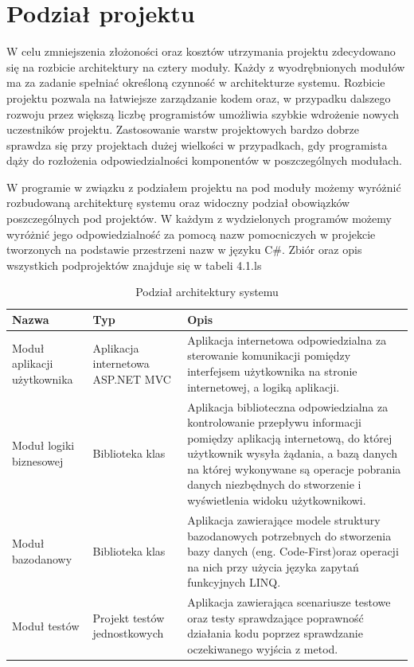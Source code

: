 
\section{Podział projektu}
{W celu zmniejszenia złożoności oraz kosztów utrzymania projektu zdecydowano się na rozbicie architektury na cztery moduły. Każdy z wyodrębnionych modułów ma za zadanie spełniać określoną czynność w architekturze systemu. Rozbicie projektu pozwala  na łatwiejsze zarządzanie kodem oraz, w przypadku dalszego rozwoju przez większą liczbę programistów umożliwia szybkie wdrożenie nowych uczestników projektu. Zastosowanie warstw projektowych bardzo dobrze sprawdza się przy projektach dużej wielkości w przypadkach, gdy programista dąży do rozłożenia odpowiedzialności komponentów w poszczególnych modułach.

W programie w związku z podziałem projektu na pod moduły możemy wyróżnić rozbudowaną architekturę systemu oraz widoczny podział obowiązków poszczególnych pod projektów. W każdym z wydzielonych programów możemy wyróżnić jego odpowiedzialność za pomocą nazw pomocniczych w projekcie tworzonych na podstawie przestrzeni nazw w języku C\#. Zbiór oraz opis wszystkich podprojektów znajduje się w tabeli 4.1.ls }

\begin{table}[htbp]
	\caption{Podział architektury systemu}
	\label{sys-architecture}
	\begin{center}
    \begin{tabular}{ | p{3cm}| p{3cm} | p{6cm} |}
    \hline Nazwa & Typ &  Opis \\ \hline   
    \hline  Moduł aplikacji użytkownika &  Aplikacja \mbox{internetowa} ASP.NET MVC & Aplikacja internetowa odpowiedzialna za sterowanie komunikacji pomiędzy interfejsem użytkownika na stronie internetowej, a logiką aplikacji.\\ \hline
	\hline  Moduł logiki biznesowej & Biblioteka klas & Aplikacja biblioteczna odpowiedzialna za kontrolowanie przepływu informacji pomiędzy aplikacją internetową, do której użytkownik wysyła żądania, a bazą danych na której wykonywane są operacje pobrania danych niezbędnych do stworzenie i wyświetlenia widoku użytkownikowi.\\ \hline
	\hline Moduł  \mbox{bazodanowy} & Biblioteka klas & Aplikacja zawierające modele struktury bazodanowych potrzebnych do stworzenia bazy danych (eng. Code-First)oraz operacji na nich przy użycia języka zapytań funkcyjnych LINQ.\\ \hline
		\hline Moduł testów & Projekt testów jednostkowych & Aplikacja zawierająca scenariusze testowe oraz testy sprawdzające poprawność działania kodu poprzez sprawdzanie oczekiwanego wyjścia z metod.\\ \hline
	\end{tabular}
\end{center}
\end{table}

